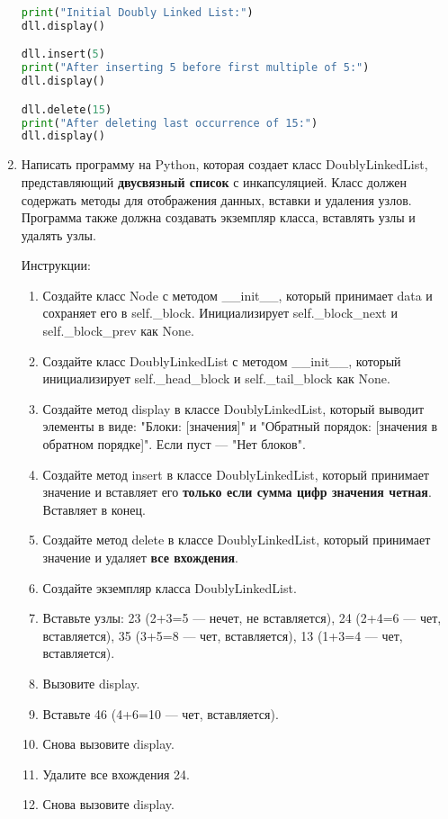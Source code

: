 \begin{enumerate}
\begin{lstlisting}[language=Python]
print("Initial Doubly Linked List:")
dll.display()

dll.insert(5)
print("After inserting 5 before first multiple of 5:")
dll.display()

dll.delete(15)
print("After deleting last occurrence of 15:")
dll.display()
\end{lstlisting}

\item Написать программу на Python, которая создает класс DoublyLinkedList, представляющий \textbf{двусвязный список} с инкапсуляцией. Класс должен содержать методы для отображения данных, вставки и удаления узлов. Программа также должна создавать экземпляр класса, вставлять узлы и удалять узлы.

Инструкции:
\begin{enumerate}
    \item Создайте класс Node с методом \_\_init\_\_, который принимает data и сохраняет его в self.\_block. Инициализирует self.\_block\_next и self.\_block\_prev как None.
    \item Создайте класс DoublyLinkedList с методом \_\_init\_\_, который инициализирует self.\_head\_block и self.\_tail\_block как None.
    \item Создайте метод display в классе DoublyLinkedList, который выводит элементы в виде: "Блоки: [значения]" и "Обратный порядок: [значения в обратном порядке]". Если пуст — "Нет блоков".
    \item Создайте метод insert в классе DoublyLinkedList, который принимает значение и вставляет его \textbf{только если сумма цифр значения четная}. Вставляет в конец.
    \item Создайте метод delete в классе DoublyLinkedList, который принимает значение и удаляет \textbf{все вхождения}.
    \item Создайте экземпляр класса DoublyLinkedList.
    \item Вставьте узлы: 23 (2+3=5 — нечет, не вставляется), 24 (2+4=6 — чет, вставляется), 35 (3+5=8 — чет, вставляется), 13 (1+3=4 — чет, вставляется).
    \item Вызовите display.
    \item Вставьте 46 (4+6=10 — чет, вставляется).
    \item Снова вызовите display.
    \item Удалите все вхождения 24.
    \item Снова вызовите display.
\end{enumerate}


\end{enumerate}
